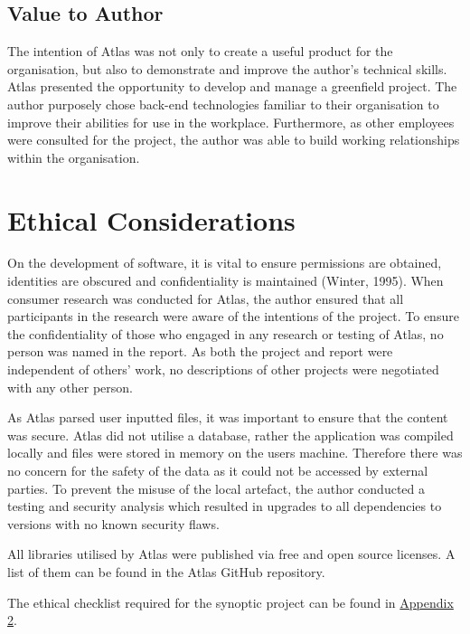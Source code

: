 \documentclass{article}
\begin{document}
\subsection{Value to Author}

The intention of Atlas was not only to create a useful product for the organisation, but also to demonstrate and improve the author's technical skills. Atlas presented the opportunity to develop and manage a greenfield project. The author purposely chose back-end technologies familiar to their organisation to improve their abilities for use in the workplace. Furthermore, as other employees were consulted for the project, the author was able to build working relationships within the organisation.

\newpage

\section{Ethical Considerations}

On the development of software, it is vital to ensure permissions are obtained, identities are obscured and confidentiality is maintained (Winter, 1995). When consumer research was conducted for Atlas, the author ensured that all participants in the research were aware of the intentions of the project. To ensure the confidentiality of those who engaged in any research or testing of Atlas, no person was named in the report. As both the project and report were independent of others’ work, no descriptions of other projects were negotiated with any other person. 

As Atlas parsed user inputted files, it was important to ensure that the content was secure. Atlas did not utilise a database, rather the application was compiled locally and files were stored in memory on the users machine. Therefore there was no concern for the safety of the data as it could not be accessed by external parties. To prevent the misuse of the local artefact, the author conducted a testing and security analysis which resulted in upgrades to all dependencies to versions with no known security flaws.

All libraries utilised by Atlas were published via free and open source licenses. A list of them can be found in the Atlas GitHub repository.

The ethical checklist required for the synoptic project can be found in \hyperref[sec:appendix-2]{Appendix 2}.

\newpage
\end{document}
